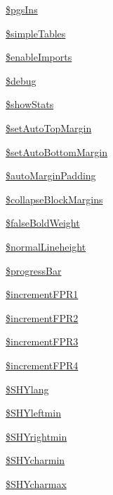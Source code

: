\begin{DoxyCompactItemize}
\item 
\hyperlink{classm_p_d_f_a6338d4aac20f26f52165c831fe0f2334}{\$pgs\-Ins}
\item 
\hyperlink{classm_p_d_f_a9aa42365f1546ed49f789d0900f0e78d}{\$simple\-Tables}
\item 
\hyperlink{classm_p_d_f_a27630893ef906a946edb41b788888f37}{\$enable\-Imports}
\item 
\hyperlink{classm_p_d_f_aadac27c9c4ea10e4f5a1677a221ea7d1}{\$debug}
\item 
\hyperlink{classm_p_d_f_a753f090cebe967b5f06c850b66c9abc3}{\$show\-Stats}
\item 
\hyperlink{classm_p_d_f_aedb2d44509c42a8c0865c6c9801a439c}{\$set\-Auto\-Top\-Margin}
\item 
\hyperlink{classm_p_d_f_a365518381adcd0eedb819e01485a6568}{\$set\-Auto\-Bottom\-Margin}
\item 
\hyperlink{classm_p_d_f_a3d493ade8dd1b0a91eda777021e11185}{\$auto\-Margin\-Padding}
\item 
\hyperlink{classm_p_d_f_a70adc7c6a880efe79efeba63b51a03ea}{\$collapse\-Block\-Margins}
\item 
\hyperlink{classm_p_d_f_a6816ddb557b7416e5a448564f6034e87}{\$false\-Bold\-Weight}
\item 
\hyperlink{classm_p_d_f_a23181d6d946a56cfdafaac7a604d52f2}{\$normal\-Lineheight}
\item 
\hyperlink{classm_p_d_f_ac570654011644c05fb5babb85c96b35a}{\$progress\-Bar}
\item 
\hyperlink{classm_p_d_f_a0a0b660b0e6a258f68868aee4a2af681}{\$increment\-F\-P\-R1}
\item 
\hyperlink{classm_p_d_f_ae8ad4f2e0f37aa400d8c9ab69f4197a4}{\$increment\-F\-P\-R2}
\item 
\hyperlink{classm_p_d_f_ad3500bbd5ac5c965c69cbdbf134e6770}{\$increment\-F\-P\-R3}
\item 
\hyperlink{classm_p_d_f_a4bf8be1f372be91f8f00278721abf039}{\$increment\-F\-P\-R4}
\item 
\hyperlink{classm_p_d_f_a9584da269bc9ba4c0c08536ef71f11cd}{\$\-S\-H\-Ylang}
\item 
\hyperlink{classm_p_d_f_aa24fb1cb827020fe133be5226ab81e8a}{\$\-S\-H\-Yleftmin}
\item 
\hyperlink{classm_p_d_f_a0f5c175368b90bd077c4aaae934a1c87}{\$\-S\-H\-Yrightmin}
\item 
\hyperlink{classm_p_d_f_a491381cb36c4eefa8ece990a5eb8956f}{\$\-S\-H\-Ycharmin}
\item 
\hyperlink{classm_p_d_f_a526dcca856605f53338e5e0bb5730b32}{\$\-S\-H\-Ycharmax}

\end{DoxyCompactItemize}
